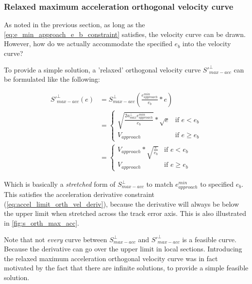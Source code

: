 \subsubsection{Relaxed maximum acceleration orthogonal velocity curve}
As noted in the previous section, as long as the \autoref{eq:e_min_approach_e_b_constraint} satisfies, the velocity curve can be drawn. However, how do we actually accommodate the specified $e_b$ into the velocity curve?\newline

To provide a simple solution, a 'relaxed' orthogonal velocity curve  ${S'}^{\perp}_{max-acc}$ can be formulated like the following:

\begin{equation}
\begin{split}
    {S'}^{\perp}_{max-acc}(e) &= {S}^{\perp}_{max-acc}(\frac{e^{min}_{approach}}{e_b} * e)\\
    &=\begin{cases}
        \sqrt{\frac{2a^{\perp}_{max}e^{min}_{approach}}{e_b}} * \sqrt{e}& \text{if $e < e_b$}\\
        V_{approach}& \text{if $e \geq e_b$}
    \end{cases}\\
    &=\begin{cases}
        V_{approach} * \sqrt{\frac{e}{e_b}}& \text{if $e < e_b$}\\
        V_{approach}& \text{if $e \geq e_b$}
    \end{cases}
    \label{eq:relaxed_max_acc_orth_vel_curve}
\end{split}
\end{equation}

Which is basically a \textit{stretched} form of ${S}^{\perp}_{max-acc}$ to match $e^{min}_{approach}$ to specified $e_b$. This satisfies the acceleration derivative constraint (\autoref{eq:accel_limit_orth_vel_deriv}), because the derivative will always be below the upper limit when stretched across the track error axis. This is also illustrated in \autoref{fig:s_orth_max_acc}.\newline

Note that not \textit{every} curve between ${S}^{\perp}_{max-acc}$ and ${S'}^{\perp}_{max-acc}$ is a feasible curve. Because the derivative can go over the upper limit in local sections. Introducing the relaxed maximum acceleration orthogonal velocity curve was in fact motivated by the fact that there are infinite solutions, to provide a simple feasible solution.

